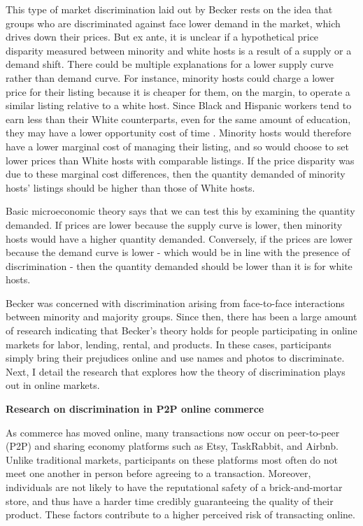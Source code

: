 This type of market discrimination laid out by Becker rests on the idea that groups who are discriminated against face lower demand in the market, which drives down their prices. But ex ante, it is unclear if a hypothetical price disparity measured between minority and white hosts is a result of a supply or a demand shift. There could be multiple explanations for a lower supply curve rather than demand curve. For instance, minority hosts could charge a lower price for their listing because it is cheaper for them, on the margin, to operate a similar listing relative to a white host. Since Black and Hispanic workers tend to earn less than their White counterparts, even for the same amount of education, they may have a lower opportunity cost of time \citep{wages}. Minority hosts would therefore have a lower marginal cost of managing their listing, and so would choose to set lower prices than White hosts with comparable listings. If the price disparity was due to these marginal cost differences, then the quantity demanded of minority hosts' listings should be higher than those of White hosts. 

Basic microeconomic theory says that we can test this by examining the quantity demanded. If prices are lower because the supply curve is lower, then minority hosts would have a higher quantity demanded. Conversely, if the prices are lower because the demand curve is lower - which would be in line with the presence of discrimination - then the quantity demanded should be lower than it is for white hosts. 

Becker was concerned with discrimination arising from face-to-face interactions between minority and majority groups. Since then, there has been a large amount of research indicating that Becker's theory holds for people participating in online markets for labor, lending, rental, and products. In these cases, participants simply bring their prejudices online and use names and photos to discriminate. Next, I detail the research that explores how the theory of discrimination plays out in online markets. 

\vspace{5mm}
\textbf{Research on discrimination in P2P online commerce}

As commerce has moved online, many transactions now occur on peer-to-peer (P2P) and sharing economy platforms such as Etsy, TaskRabbit, and Airbnb. Unlike traditional markets, participants on these platforms most often do not meet one another in person before agreeing to a transaction. Moreover, individuals are not likely to have the reputational safety of a brick-and-mortar store, and thus have a harder time credibly guaranteeing the quality of their product. These factors contribute to a higher perceived risk of transacting online. 

